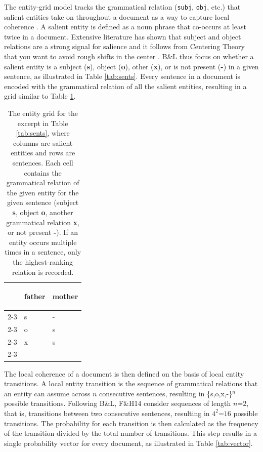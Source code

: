 The entity-grid model tracks the grammatical relation (\texttt{subj}, \texttt{obj}, etc.) that salient entities take on throughout a document as a way to capture local coherence . A salient entity is defined as a noun phrase that co-occurs at least twice in a document. Extensive literature has shown that subject and object relations are a strong signal for salience and it follows from Centering Theory that you want to avoid rough shifts in the center \cite{Grosz:1995,Strube:1999}. B\&L thus focus on whether a salient entity is a subject (\textbf{s}), object (\textbf{o}), other (\textbf{x}), or is not present (\textbf{-}) in a given sentence, as illustrated in Table \ref{tab:sents}. Every sentence in a document is encoded with the grammatical relation of all the salient entities, resulting in a grid similar to Table \ref{tab:grid}. 

\begin{table}[h]
\centering
\begin{tabular}{lll}
       & \begin{turn}{45}father\end{turn}  
       & \begin{turn}{45}mother\end{turn}  \\ \cline{2-3} 
\multicolumn{1}{l|}{(1)} & \multicolumn{1}{l|}{s} & \multicolumn{1}{l|}{-} \\ \cline{2-3} 
\multicolumn{1}{l|}{(2)} & \multicolumn{1}{l|}{o} & \multicolumn{1}{l|}{s} \\ \cline{2-3} 
\multicolumn{1}{l|}{(3)} & \multicolumn{1}{l|}{x} & \multicolumn{1}{l|}{s} \\ \cline{2-3} 
\end{tabular}
\vspace{-.5em}
\caption{\label{tab:grid} The entity grid for the excerpt in Table \ref{tab:sents}, where columns are salient entities and rows are sentences. Each cell contains the grammatical relation of the given entity for the given sentence (subject \textbf{s}, object \textbf{o}, another grammatical relation \textbf{x}, or not present \textbf{-}). If an entity occurs multiple times in a sentence, only the highest-ranking relation is recorded.}
\end{table}

The local coherence of a document is then defined on the basis of local entity transitions. A local entity transition is the sequence of grammatical relations that an entity can assume across $n$ consecutive sentences, resulting in \{s,o,x,-\}$^n$ possible transitions. Following B\&L, F\&H14 consider sequences of length $n$=$2$, that is, transitions between two consecutive sentences, resulting in $4^2$=$16$ possible transitions. The probability for each transition is then calculated as the frequency of the transition divided by the total number of transitions. This step results in a single probability vector for every document, as illustrated in Table \ref{tab:vector}.

